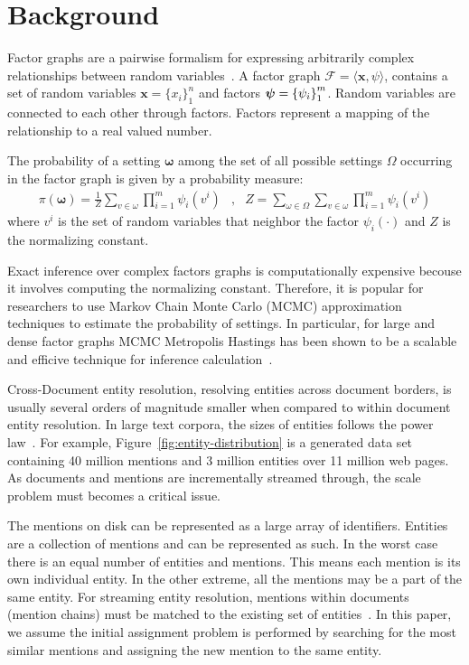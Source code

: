
\section{Background}
\label{sec:optimizer:background}

Factor graphs
are a pairwise formalism for expressing arbitrarily complex
relationships between random variables~\cite{koller2009probabilistic}.
A factor graph $\mathcal{F} = \langle \textbf{x}, \psi \rangle$, contains a set of random
variables $ \textbf{x} = {\{x_i \}}^n_1$ and
factors ${\textbf{\boldmath$\psi$\unboldmath}} = { \{\psi_i\} }^m_1 $.
Random variables are connected to each other through factors.
Factors represent a mapping of the relationship to a real valued number.

The probability of a setting $\mathbf{\omega}$ among the set of all possible
settings $\Omega$ occurring in the factor graph is given by a probability measure:
\begin{align*}
\pi(\mathbf{\omega}) = \frac{1}{Z} \sum_{v \in \omega} \prod_{i=1}^{m} \psi_i(v^i) &,&  Z = \sum_{\omega \in \Omega} \sum_{v \in \omega}  \prod_{i=1}^{m} \psi_i(v^i) 
\end{align*}
where $v^i$ is the set of random variables that neighbor the factor
$\psi_{i}(\cdot)$ and $Z$ is the normalizing constant.


Exact inference over complex factors graphs is computationally expensive
becouse it involves computing the normalizing constant.
Therefore, it is popular for researchers to use Markov Chain Monte Carlo (MCMC) 
approximation techniques to estimate the probability of settings.
In particular, for large and dense factor graphs MCMC Metropolis Hastings has
been shown to be a scalable and efficive technique for 
inference calculation~\cite{singh2011large}.

Cross-Document entity resolution, resolving entities across document borders,
is usually several orders of magnitude smaller when compared to within document entity resolution.
In large text corpora, the sizes of entities follows the power law~\cite{singh12:wiki-links}.
For example, Figure~\ref{fig:entity-distribution} is a generated data set containing
40 million mentions and 3 million entities over 11 million web pages.
As documents and mentions are incrementally streamed through,
the scale problem must becomes a critical issue.

The mentions on disk can be represented as a large array of identifiers.
Entities are a collection of mentions and can be represented as such.
In the worst case there is an equal number of entities and mentions.
This means each mention is its own individual entity.
In the other extreme, all the mentions may be a part of the same entity.
For streaming entity resolution, mentions within documents (mention chains)
must be matched to the existing set of entities~\cite{rao2010streaming}.
In this paper, we assume the initial assignment problem is performed by searching for the most similar mentions and assigning the new mention to the same entity.

